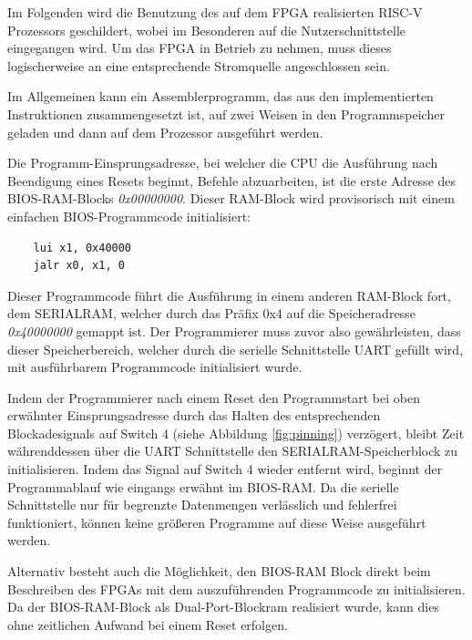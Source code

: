 
Im Folgenden wird die Benutzung des auf dem FPGA realisierten RISC-V Prozessors geschildert, wobei im Besonderen auf die Nutzerschnittstelle eingegangen wird. Um das FPGA in Betrieb zu nehmen, muss dieses logischerweise an eine entsprechende Stromquelle angeschlossen sein.


Im Allgemeinen kann ein Assemblerprogramm, das aus den implementierten Instruktionen zusammengesetzt ist, auf zwei Weisen in den Programmspeicher geladen und dann auf dem Prozessor ausgef\"uhrt werden.


Die Programm-Einsprungsadresse, bei welcher die CPU die Ausf\"uhrung nach Beendigung eines Resets beginnt, Befehle abzuarbeiten, ist die erste Adresse des BIOS-RAM-Blocks \textit{0x00000000}. Dieser RAM-Block wird provisorisch mit einem einfachen BIOS-Programmcode initialisiert:


\begin{lstlisting}
	lui x1, 0x40000
	jalr x0, x1, 0
\end{lstlisting}

Dieser Programmcode f\"uhrt  die Ausf\"uhrung in einem anderen RAM-Block fort, dem SERIALRAM, welcher durch das Pr\"afix 0x4 auf die Speicheradresse \textit{0x40000000} gemappt ist. Der Programmierer muss zuvor also gew\"ahrleisten, dass dieser Speicherbereich, welcher durch die serielle Schnittstelle UART gef\"ullt wird, mit ausf\"uhrbarem Programmcode initialisiert wurde.

Indem der Programmierer nach einem Reset den Programmstart bei oben erw\"ahnter Einsprungsadresse durch das Halten des entsprechenden Blockadesignals auf Switch 4 (siehe Abbildung \ref{fig:pinning}) verz\"ogert, bleibt Zeit w\"ahrenddessen \"uber die UART Schnittstelle den SERIALRAM-Speicherblock zu initialisieren. Indem das Signal auf Switch 4 wieder entfernt wird, beginnt der Programmablauf wie eingangs erw\"ahnt im BIOS-RAM.
Da die serielle Schnittstelle nur f\"ur begrenzte Datenmengen verl\"asslich und fehlerfrei funktioniert, k\"onnen keine gr\"o\ss{}eren Programme auf diese Weise ausgef\"uhrt werden.


Alternativ besteht auch die M\"oglichkeit, den BIOS-RAM Block direkt beim Beschreiben des FPGAs mit dem auszuf\"uhrenden Programmcode zu initialisieren. Da der BIOS-RAM-Block als Dual-Port-Blockram realisiert wurde, kann dies ohne zeitlichen Aufwand bei einem Reset erfolgen.

